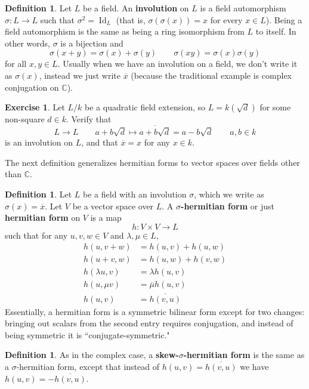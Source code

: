 \documentclass[12pt]{article}
\theoremstyle{definition}
\newtheorem{definition}[theorem]{Definition}
\newtheorem{exercise}[theorem]{Exercise}
\numberwithin{theorem}{subsection}
\newcommand{\C}{\mathbb{C}}
\newcommand{\sig}{\sigma}
\newcommand{\lam}{\lambda}
\newcommand{\tbf}{\textbf}
\newcommand{\noi}{\noindent}
\newcommand{\ov}{\overline}
\DeclareMathOperator{\Id}{Id}
\begin{document}
\begin{definition}
Let $L$ be a field. An \tbf{involution} on $L$ is a field automorphism $\sig:L \to L$ such that $\sig^2 = \Id_L$ (that is, $\sig(\sig(x)) = x$ for every $x \in L$). Being a field automorphism is the same as being a ring isomorphism from $L$ to itself. In other words, $\sig$ is a bijection and
\[
	\sig(x+y) = \sig(x) + \sig(y) \qquad \sig(xy) = \sig(x) \sig(y)
\]
for all $x,y \in L$. Usually when we have an involution on a field, we don't write it as $\sig(x)$, instead we just write $\ov x$ (because the traditional example is complex conjugation on $\C$).
\end{definition}

\begin{exercise}
Let $L/k$ be a quadratic field extension, so $L = k(\sqrt{d})$ for some non-square $d \in k$. Verify that
\[
	L \to L \qquad a+b \sqrt{d} \mapsto \ov{a+b\sqrt{d}} = a - b \sqrt{d} \qquad a,b \in k
\]
is an involution on $L$, and that $\ov x = x$ for any $x \in k$.
\end{exercise}

\noi The next definition generalizes hermitian forms to vector spaces over fields other than $\C$.

\begin{definition}
Let $L$ be a field with an involution $\sig$, which we write as $\sig(x) = \ov x$. Let $V$ be a vector space over $L$. A \tbf{$\sig$-hermitian form} or just \tbf{hermitian form} on $V$ is a map
\[
	h:V \times V \to L
\]
such that for any $u,v, w \in V$ and $\lam, \mu \in L$, 
\begin{align*}
	h(u, v+w) &= h(u, v) + h(u,w) \\
	h(u+v, w) &= h(u,w) + h(v,w) \\
	h( \lam u, v) &= \lam h(u,v) \\
	h( u, \mu v) &= \ov \mu h(u,v) \\
	h(u,v) &= \ov{h(v,u)}
\end{align*}
Essentially, a hermitian form is a symmetric bilinear form except for two changes: bringing out scalars from the second entry requires conjugation, and instead of being symmetric it is ``conjugate-symmetric."
\end{definition}

\begin{definition}
As in the complex case, a \tbf{skew-$\sig$-hermitian form} is the same as a $\sig$-hermitian form, except that instead of $h(u,v) = \ov{h(v,u)}$ we have $h(u,v) = - \ov{h(v,u)}$.
\end{definition}
\end{document}
